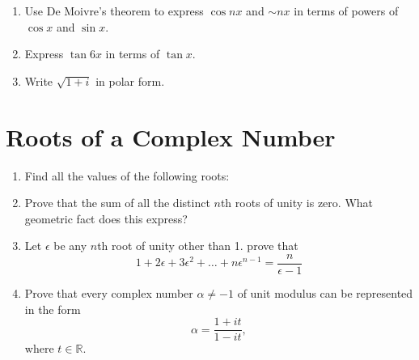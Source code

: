 \documentclass[11pt, oneside]{book}
\begin{document}
\begin{enumerate}
	\item Use De Moivre's theorem to express $\cos nx$ and $\sim nx$ in terms of powers of $\cos x$ and $\sin x$.

	\item Express $\tan 6x$ in terms of $\tan x$.

	\item Write $\sqrt{1 + i}$ in polar form.
\end{enumerate}


\section{Roots of a Complex Number} %
\label{sec:roots_of_a_complex_number}

\begin{enumerate}
	\item Find all the values of the following roots:


	\item Prove that the sum of all the distinct $n$th roots of unity is zero. What geometric fact does this express?

	\item Let $\epsilon$ be any $n$th root of unity other than 1. prove that
	\begin{equation*}
		1 + 2\epsilon + 3 \epsilon^2 + \hdots + n\epsilon^{n - 1} = \frac{n}{\epsilon - 1} 
	\end{equation*}

	\item Prove that every complex number $\alpha \neq -1$ of unit modulus can be represented in the form
	\begin{equation*}
		\alpha = \frac{1 + it}{1 - it},
	\end{equation*}
	where $t \in \mathbb{R}$.
\end{enumerate}
\end{document}

